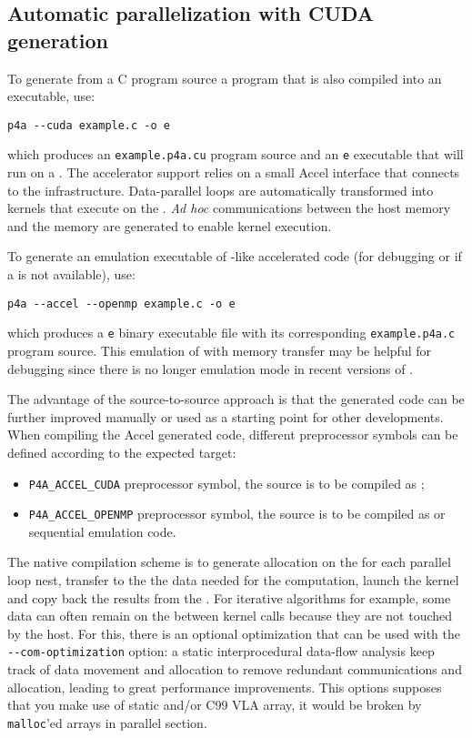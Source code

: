 \documentclass[a4paper]{article}
\begin{document}
\subsection{Automatic parallelization with CUDA generation}
\label{sec:autom-parall-with-1}

To generate from a C program source a \Acuda program that is also compiled
into an executable, use:
\begin{verbatim}
p4a --cuda example.c -o e
\end{verbatim}
which produces an \texttt{example.p4a.cu} \Acuda program source and an
\texttt{e} executable that will run on a \Agpu. The \Agpu accelerator
support relies on a small \Apfa Accel interface that connects to the
\Acuda infrastructure. Data-parallel loops are automatically transformed
into \Acuda kernels that execute on the \Agpu. \emph{Ad
  hoc} communications between the host memory and the \Agpu memory are
generated to enable kernel execution.

To generate an \Aopenmp emulation executable of \Agpu-like accelerated
code (for debugging or if a \Agpu is not available), use:
\begin{verbatim}
p4a --accel --openmp example.c -o e
\end{verbatim}
which produces a \texttt{e} binary executable file with its
corresponding \texttt{example.p4a.c} program source. This \Aopenmp
emulation of \Acuda with memory transfer may be helpful for debugging
since there is no longer emulation mode in recent versions of \Acuda.

The advantage of the source-to-source approach is that the
generated code can be further improved manually or used as a starting
point for other
developments. When compiling the \Apfa Accel generated code,
different preprocessor symbols can be defined according to the expected target:
\begin{itemize}
\item \verb|P4A_ACCEL_CUDA| preprocessor symbol, the source is to be
  compiled as \Acuda;
\item \verb|P4A_ACCEL_OPENMP| preprocessor symbol, the source is to be
  compiled as \Aopenmp or sequential emulation code.
\end{itemize}

The native compilation scheme is to generate allocation on the \Agpu for
each parallel loop nest, transfer to the \Agpu the data needed for the
computation, launch the kernel and copy back the results from the \Agpu.
For iterative algorithms for example, some data can often remain on the
\Agpu between kernel calls because they are not touched by the host. For
this, there is an optional optimization that can be used with the
\verb|--com-optimization| option: a static interprocedural data-flow
analysis keep track of data movement and allocation to remove redundant
communications and allocation, leading to great performance improvements. This
options supposes that you make use of static and/or C99 VLA array, it would 
be broken by \texttt{malloc}'ed arrays in parallel section.
\end{document}
